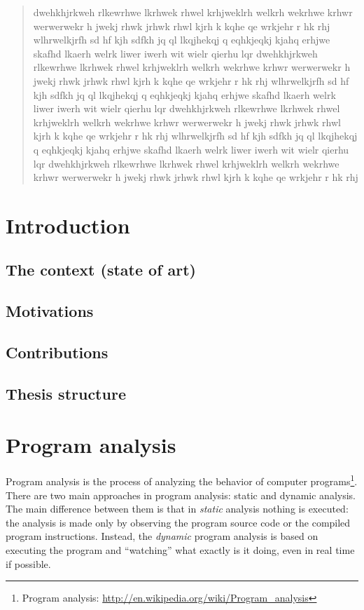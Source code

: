 \documentclass[a4paper,11pt]{report}
\begin{document}
\begin{abstract}
dwehkhjrkweh rlkewrhwe lkrhwek rhwel krhjweklrh welkrh wekrhwe krhwr
werwerwekr h jwekj rhwk jrhwk rhwl kjrh k kqhe qe wrkjehr r hk rhj
wlhrwelkjrfh sd hf kjh sdfkh jq ql lkqjhekqj q eqhkjeqkj kjahq 
erhjwe skafhd lkaerh welrk liwer  iwerh wit wielr qierhu lqr 
dwehkhjrkweh rlkewrhwe lkrhwek rhwel krhjweklrh welkrh wekrhwe krhwr
werwerwekr h jwekj rhwk jrhwk rhwl kjrh k kqhe qe wrkjehr r hk rhj
wlhrwelkjrfh sd hf kjh sdfkh jq ql lkqjhekqj q eqhkjeqkj kjahq 
erhjwe skafhd lkaerh welrk liwer  iwerh wit wielr qierhu lqr 
dwehkhjrkweh rlkewrhwe lkrhwek rhwel krhjweklrh welkrh wekrhwe krhwr
werwerwekr h jwekj rhwk jrhwk rhwl kjrh k kqhe qe wrkjehr r hk rhj
wlhrwelkjrfh sd hf kjh sdfkh jq ql lkqjhekqj q eqhkjeqkj kjahq 
erhjwe skafhd lkaerh welrk liwer  iwerh wit wielr qierhu lqr 
dwehkhjrkweh rlkewrhwe lkrhwek rhwel krhjweklrh welkrh wekrhwe krhwr
werwerwekr h jwekj rhwk jrhwk rhwl kjrh k kqhe qe wrkjehr r hk rhj

\end{abstract}


\tableofcontents

\chapter{Introduction}


\section{The context (state of art)}
\section{Motivations}
\section{Contributions}
\section{Thesis structure}

\chapter{Program analysis}

Program analysis is the process of analyzing the behavior of computer programs\footnote{Program analysis: \url{http://en.wikipedia.org/wiki/Program_analysis}}.
There are two main approaches in program analysis: static and dynamic analysis.
The main difference between them is that in \emph{static} analysis nothing is executed: the analysis
is made only by observing the program source code or the compiled program instructions. Instead, the \emph{dynamic} program analysis is based on executing the program and ``watching'' what exactly is it doing, even in real time if possible.
\end{document}
